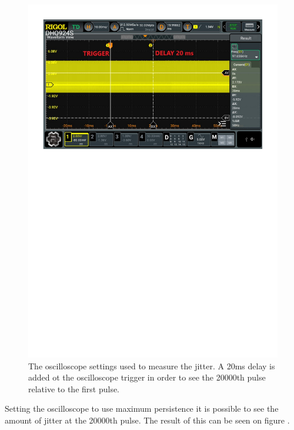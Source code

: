 \begin{figure}[H]
    \centering
    \includegraphics[clip, trim=0 50 0 50, width=1\textwidth]{Appendix/Figures/A_PulseWidthGen_JitterA.pdf}
    \caption{The oscilloscope settings used to measure the jitter. A 20ms delay is added ot the oscilloscope trigger in order to see the 20000th pulse relative to the first pulse.}
    \label{fig:A_PulseGenWidth_JitterTestA}
\end{figure}

Setting the oscilloscope to use maximum persistence it is possible to see the amount of jitter at the 20000th pulse. The result of this can be seen on figure .

